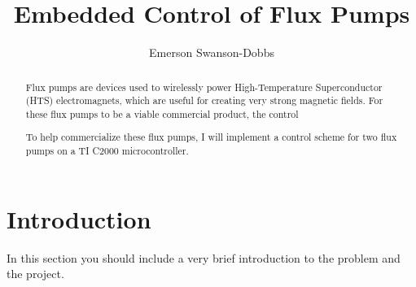 \documentclass[11pt, a4paper, twoside, openright]{article}
\title{Embedded Control of Flux Pumps}
\author{Emerson Swanson-Dobbs}
\date{}
\begin{document}
\frontmatter


\begin{abstract}
Flux pumps are devices used to wirelessly power High-Temperature Superconductor (HTS) electromagnets, which are useful for creating very strong magnetic fields. For these flux pumps to be a viable commercial product, the control 

To help commercialize these flux pumps, I will implement a control scheme for two flux pumps on a TI C2000 microcontroller.

\end{abstract}


\maketitle




\mainmatter



\section{Introduction}

In this section you should include a very brief introduction to the
problem and the project.
\end{document}
